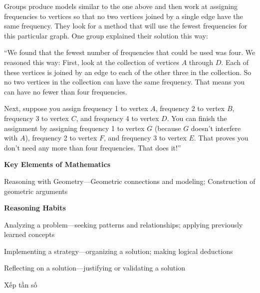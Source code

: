 \documentclass[
  10pt,
  a4paper,
  landscape,
  twoside,
  openany
]{scrbook}
\begin{document}
{Groups produce models similar to the one above and then work at assigning frequencies to vertices so that no two vertices joined by a single edge have the same frequency. They look for a method that will use the fewest frequencies for this particular graph. One group explained their solution this way:

``We found that the fewest number of frequencies that could be used was four. We reasoned this way: First, look at the collection of vertices $A$ through $D$. Each of these vertices is joined by an edge to each of the other three in the collection. So no two vertices in the collection can have the same frequency. That means you can have no fewer than four frequencies.

Next, suppose you assign frequency 1 to vertex $A$, frequency 2 to vertex $B$, frequency 3 to vertex $C$, and frequency 4 to vertex $D$. You can finish the assignment by assigning frequency 1 to vertex $G$ (because $G$ doesn't interfere with $A$), frequency 2 to vertex $F$, and frequency 3 to vertex $E$. That proves you don't need any more than four frequencies. That does it!''

\noindent
\textbf{Key Elements of Mathematics}

Reasoning with Geometry---Geometric connections and modeling; Construction of geometric arguments

\noindent
\textbf{Reasoning Habits}

Analyzing a problem---seeking patterns and relationships; applying previously learned concepts

Implementing a strategy---organizing a solution; making logical deductions

Reflecting on a solution---justifying or validating a solution
}
{Xếp tần số}
\end{document}
